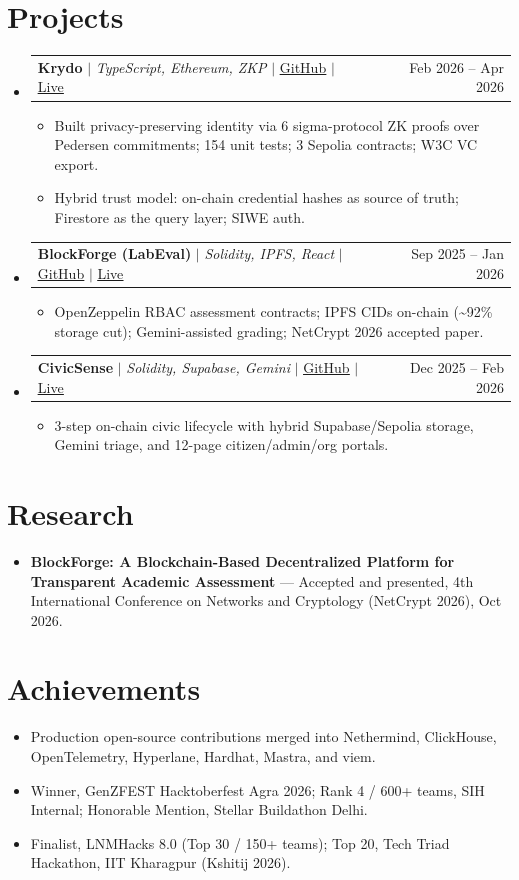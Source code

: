 \documentclass[letterpaper,11pt]{article}
\makeatletter
\newcommand{\resumeItem}[1]{
  \item\small{
    {#1 \vspace{-5pt}}
  }
}
\newcommand{\resumeProjectHeading}[2]{
  \item
    \begin{tabular*}{0.97\textwidth}{l@{\extracolsep{\fill}}r}
      \small#1 & #2 \\
    \end{tabular*}\vspace{-9pt}
}
\newcommand{\resumeSubHeadingListStart}{\begin{itemize}[leftmargin=0.15in, label={}]}
\newcommand{\resumeSubHeadingListEnd}{\end{itemize}}
\newcommand{\resumeItemListStart}{\begin{itemize}}
\newcommand{\resumeItemListEnd}{\end{itemize}\vspace{-10pt}}
\makeatother
\begin{document}
\section{Projects}
  \resumeSubHeadingListStart
    \resumeProjectHeading
      {\textbf{Krydo} $|$ \emph{TypeScript, Ethereum, ZKP} $|$ \href{https://github.com/nishant-uxs/krydo}{\underline{GitHub}} $|$ \href{https://krydo.onrender.com}{\underline{Live}}}{Feb 2026 -- Apr 2026}
      \resumeItemListStart
        \resumeItem{Built privacy-preserving identity via 6 sigma-protocol ZK proofs over Pedersen commitments; 154 unit tests; 3 Sepolia contracts; W3C VC export.}
        \resumeItem{Hybrid trust model: on-chain credential hashes as source of truth; Firestore as the query layer; SIWE auth.}
      \resumeItemListEnd
    \resumeProjectHeading
      {\textbf{BlockForge (LabEval)} $|$ \emph{Solidity, IPFS, React} $|$ \href{https://github.com/nishant-uxs/labeval}{\underline{GitHub}} $|$ \href{https://blockchain-labeval.onrender.com}{\underline{Live}}}{Sep 2025 -- Jan 2026}
      \resumeItemListStart
        \resumeItem{OpenZeppelin RBAC assessment contracts; IPFS CIDs on-chain (\textasciitilde{}92\% storage cut); Gemini-assisted grading; NetCrypt 2026 accepted paper.}
      \resumeItemListEnd
    \resumeProjectHeading
      {\textbf{CivicSense} $|$ \emph{Solidity, Supabase, Gemini} $|$ \href{https://github.com/nishant-uxs/CivicSense}{\underline{GitHub}} $|$ \href{https://civic-sense-six.vercel.app}{\underline{Live}}}{Dec 2025 -- Feb 2026}
      \resumeItemListStart
        \resumeItem{3-step on-chain civic lifecycle with hybrid Supabase/Sepolia storage, Gemini triage, and 12-page citizen/admin/org portals.}
      \resumeItemListEnd
  \resumeSubHeadingListEnd

\section{Research}
  \begin{itemize}[leftmargin=0.15in]
    \resumeItem{\textbf{BlockForge: A Blockchain-Based Decentralized Platform for Transparent Academic Assessment} --- Accepted and presented, 4th International Conference on Networks and Cryptology (NetCrypt 2026), Oct 2026.}
  \end{itemize}

\section{Achievements}
  \begin{itemize}[leftmargin=0.15in]
    \resumeItem{Production open-source contributions merged into Nethermind, ClickHouse, OpenTelemetry, Hyperlane, Hardhat, Mastra, and viem.}
    \resumeItem{Winner, GenZFEST Hacktoberfest Agra 2026; Rank 4 / 600+ teams, SIH Internal; Honorable Mention, Stellar Buildathon Delhi.}
    \resumeItem{Finalist, LNMHacks 8.0 (Top 30 / 150+ teams); Top 20, Tech Triad Hackathon, IIT Kharagpur (Kshitij 2026).}
  \end{itemize}
\end{document}
